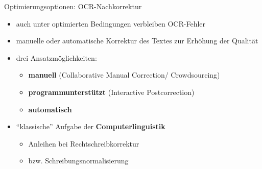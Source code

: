 \documentclass{bbawslides}
\begin{document}
\begin{bbawslide}{Optimierungsoptionen: OCR-Nachkorrektur}
  \vspace*{7mm}%
  \centerslidestrue%
  \begin{itemize}
    \item auch unter optimierten Bedingungen verbleiben OCR-Fehler
    \item manuelle oder automatische Korrektur des Textes zur Erhöhung der Qualität
    \item drei Ansatzmöglichkeiten:
    \begin{itemize}\small
      \item \textbf{manuell} (Collaborative Manual Correction/ Crowdsourcing)
      \item \textbf{programmunterstützt} (Interactive Postcorrection)
      \item \textbf{automatisch}
    \end{itemize}
    \item \enquote{klassische} Aufgabe der \textbf{Computerlinguistik}
    \begin{itemize}\small
      \item Anleihen bei Rechtschreibkorrektur
      \item bzw. Schreibungsnormalisierung 
    \end{itemize}
  \end{itemize}
\end{bbawslide}
\end{document}
